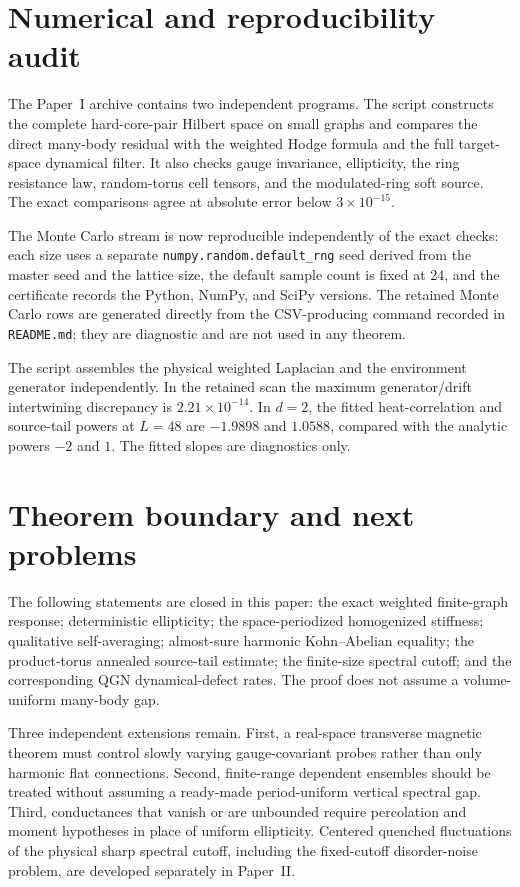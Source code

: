 \documentclass[11pt]{article}
\theoremstyle{definition}
\theoremstyle{remark}
\begin{document}
\section{Numerical and reproducibility audit}
\label{sec:numerics}

The Paper~I archive contains two independent programs.  The script
 constructs the complete hard-core-pair
Hilbert space on small graphs and compares the direct many-body residual with
the weighted Hodge formula and the full target-space dynamical filter.  It also
checks gauge invariance, ellipticity, the ring resistance law, random-torus cell
tensors, and the modulated-ring soft source.  The exact comparisons agree at
absolute error below $3\times10^{-15}$.

The Monte Carlo stream is now reproducible independently of the exact checks:
each size uses a separate \texttt{numpy.random.default\_rng} seed derived from
the master seed and the lattice size, the default sample count is fixed at 24,
and the certificate records the Python, NumPy, and SciPy versions.  The retained Monte Carlo rows are generated directly from the CSV-producing command recorded in \texttt{README.md}; they are diagnostic and are not used in any theorem.

The script  assembles the physical
weighted Laplacian and the environment generator independently.  In the
retained scan the maximum generator/drift intertwining discrepancy is
$2.21\times10^{-14}$.  In $d=2$, the fitted heat-correlation and source-tail
powers at $L=48$ are $-1.9898$ and $1.0588$, compared with the analytic powers
$-2$ and $1$.  The fitted slopes are diagnostics only.

\section{Theorem boundary and next problems}
\label{sec:boundary}

The following statements are closed in this paper: the exact weighted finite-graph response; deterministic ellipticity; the space-periodized homogenized stiffness; qualitative self-averaging; almost-sure harmonic Kohn--Abelian equality; the product-torus annealed source-tail estimate; the finite-size spectral cutoff; and the corresponding QGN dynamical-defect rates.  The proof does not assume a volume-uniform many-body gap.

Three independent extensions remain.  First, a real-space transverse magnetic theorem must control slowly varying gauge-covariant probes rather than only harmonic flat connections.  Second, finite-range dependent ensembles should be treated without assuming a ready-made period-uniform vertical spectral gap.  Third, conductances that vanish or are unbounded require percolation and moment hypotheses in place of uniform ellipticity.  Centered quenched fluctuations of the physical sharp spectral cutoff, including the fixed-cutoff disorder-noise problem, are developed separately in Paper~II.
\end{document}
